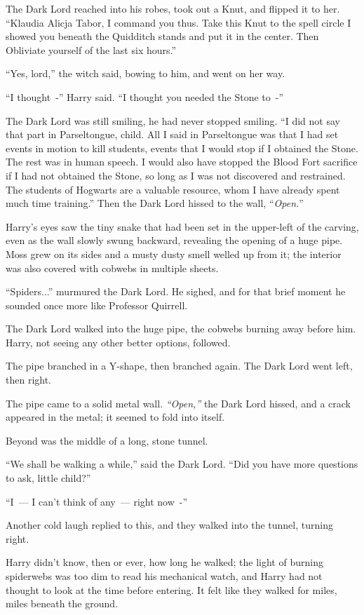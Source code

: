 The Dark Lord reached into his robes, took out a Knut, and flipped it to her. ``Klaudia Alicja Tabor, I command you thus. Take this Knut to the spell circle I showed you beneath the Quidditch stands and put it in the center. Then Obliviate yourself of the last six hours.''

``Yes, lord,'' the witch said, bowing to him, and went on her way.

``I thought~-'' Harry said. ``I thought you needed the Stone to~-''

The Dark Lord was still smiling, he had never stopped smiling. ``I did not say that part in Parseltongue, child. All I said in Parseltongue was that I had set events in motion to kill students, events that I would stop if I obtained the Stone. The rest was in human speech. I would also have stopped the Blood Fort sacrifice if I had not obtained the Stone, so long as I was not discovered and restrained. The students of Hogwarts are a valuable resource, whom I have already spent much time training.'' Then the Dark Lord hissed to the wall, ``\emph{Open.}''

Harry's eyes saw the tiny snake that had been set in the upper-left of the carving, even as the wall slowly swung backward, revealing the opening of a huge pipe. Moss grew on its sides and a musty dusty smell welled up from it; the interior was also covered with cobwebs in multiple sheets.

``Spiders...'' murmured the Dark Lord. He sighed, and for that brief moment he sounded once more like Professor Quirrell.

The Dark Lord walked into the huge pipe, the cobwebs burning away before him. Harry, not seeing any other better options, followed.

The pipe branched in a Y-shape, then branched again. The Dark Lord went left, then right.

The pipe came to a solid metal wall. \emph{``Open,''} the Dark Lord hissed, and a crack appeared in the metal; it seemed to fold into itself.

Beyond was the middle of a long, stone tunnel.

``We shall be walking a while,'' said the Dark Lord. ``Did you have more questions to ask, little child?''

``I~--- I can't think of any~--- right now~-''

Another cold laugh replied to this, and they walked into the tunnel, turning right.

Harry didn't know, then or ever, how long he walked; the light of burning spiderwebs was too dim to read his mechanical watch, and Harry had not thought to look at the time before entering. It felt like they walked for miles, miles beneath the ground.

